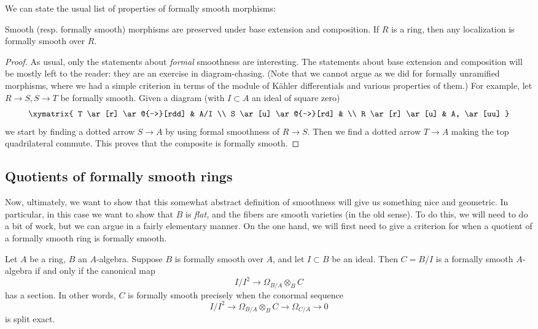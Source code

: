 We can state the usual list of properties of formally smooth morphisms:

\begin{proposition}
\label{smoothsorite}
Smooth (resp. formally smooth) morphisms are preserved under base extension and
composition.
If $R$ is a ring, then any localization  is formally smooth over $R$.
\end{proposition} 
\begin{proof}  As usual, only the statements about \emph{formal} smoothness are
interesting.
The statements about base extension and composition will be mostly left to the reader:
they are an exercise in diagram-chasing. (Note that we cannot argue as we did
for formally unramified morphisms, where we had a simple criterion in terms of
the module of K\"ahler differentials and various properties of them.) 
For example, let $R \to S, S \to T$ be formally smooth. 
Given a diagram (with $I \subset A$ an ideal of square zero)
\[ \xymatrix{
T \ar[r]  \ar@{-->}[rdd]  & A/I \\
S  \ar[u] \ar@{-->}[rd] & \\
R \ar[r] \ar[u] & A, \ar[uu]
}\]
we start by finding a dotted arrow $S \to A$ by using formal smoothness of $R
\to S$. Then we find a dotted arrow $T \to A$ making the top quadrilateral
commute. This proves that the composite is formally smooth. 
\end{proof} 
\subsection{Quotients of formally smooth rings}

Now, ultimately, we want to show that this somewhat abstract definition of
smoothness will give us something nice and geometric. In particular, in this case we want to show
that $B$ is \emph{flat,} and the fibers are smooth varieties (in the old sense).
To do this, we will need to do a bit of work, but we can argue in a fairly
elementary manner. On the one hand, we will first need to give a criterion for when a
quotient of a formally smooth ring is formally smooth.



\begin{theorem}
\label{smoothconormal}
Let $A$ be a ring, $B$ an $A$-algebra. Suppose $B$ is formally smooth over $A$,
and let $I \subset B$ be an ideal. 
Then $C = B/I$ is a formally smooth $A$-algebra if and only if the canonical map
\[ I/I^2 \to \Omega_{B/A} \otimes_B C  \]
has a section.
In other words, $C$ is formally smooth precisely when the conormal sequence
\[  I/I^2 \to \Omega_{B/A} \otimes_B C \to \Omega_{C/A} \to 0 \]
is split exact.
\end{theorem} 

